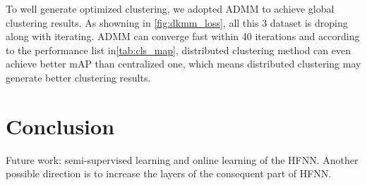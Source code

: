 \documentclass[journal,twocolumn,10pt]{IEEEtran}
\begin{document}
\begin{figure*}[!hbp]
  \centering
  \vspace{3pt}
  \hspace{3pt}
  \vspace{3pt}
  \vspace{3pt}
  
  \vspace{3pt}
  \vspace{3pt}
  \caption{\normalsize Loss of Kmeans using ADMM.}

  \label{fig:dkmm_loss}

\end{figure*}
To well generate optimized clustering, we adopted ADMM to achieve global clustering results. As showning in \ref{fig:dkmm_loss}, all this 3 dataset is droping along with iterating. ADMM can converge fast within 40 iterations and according to the performance list in\ref{tab:cls_map}, distributed clustering method can even achieve better mAP than centralized one, which means distributed clustering may generate better clustering results.

\section{Conclusion}

Future work: semi-supervised learning and online learning of the HFNN. Another possible direction is to increase the layers of the consequent part of HFNN.


\end{document}
